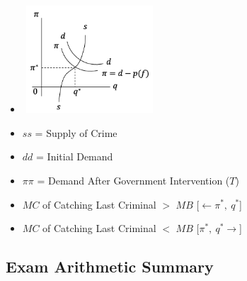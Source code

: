 \documentclass[11pt, english]{article}
\begin{document}
\begin{enumerate}
\begin{itemize}
			\item \includegraphics[width=5cm,height=4cm]{EC315-IMG/1.png}
			\item $ss$ = Supply of Crime
			\item $dd$ = Initial Demand
			\item $\pi\pi$ = Demand After Government Intervention ($T$)
			\item $MC$ of Catching Last Criminal $>$ $MB$ [$\leftarrow\pi^*,\ q^*$]
			\item $MC$ of Catching Last Criminal $<$ $MB$ [$\pi^*,\ q^*\rightarrow$]
		\end{itemize}
	\end{enumerate}

	\newpage

	\subsection{Exam Arithmetic Summary}
\end{document}
